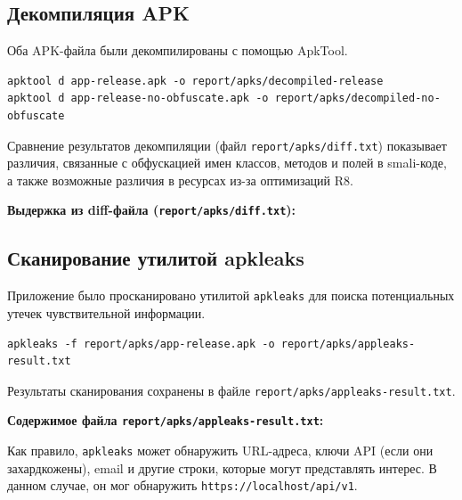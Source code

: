 \subsection{Декомпиляция APK}
Оба APK-файла были декомпилированы с помощью ApkTool.
\begin{verbatim}
apktool d app-release.apk -o report/apks/decompiled-release
apktool d app-release-no-obfuscate.apk -o report/apks/decompiled-no-obfuscate
\end{verbatim}
Сравнение результатов декомпиляции (файл \texttt{report/apks/diff.txt}) показывает различия, связанные с обфускацией имен классов, методов и полей в smali-коде, а также возможные различия в ресурсах из-за оптимизаций R8.

\textbf{Выдержка из diff-файла (\texttt{report/apks/diff.txt}):}
\begin{small} %

\end{small}


\subsection{Сканирование утилитой apkleaks}
Приложение было просканировано утилитой \texttt{apkleaks} для поиска потенциальных утечек чувствительной информации.
\begin{verbatim}
apkleaks -f report/apks/app-release.apk -o report/apks/appleaks-result.txt
\end{verbatim}
Результаты сканирования сохранены в файле \texttt{report/apks/appleaks-result.txt}.

\textbf{Содержимое файла \texttt{report/apks/appleaks-result.txt}:}
\begin{small} %

\end{small}
Как правило, \texttt{apkleaks} может обнаружить URL-адреса, ключи API (если они захардкожены), email и другие строки, которые могут представлять интерес. В данном случае, он мог обнаружить \texttt{https://localhost/api/v1}.

